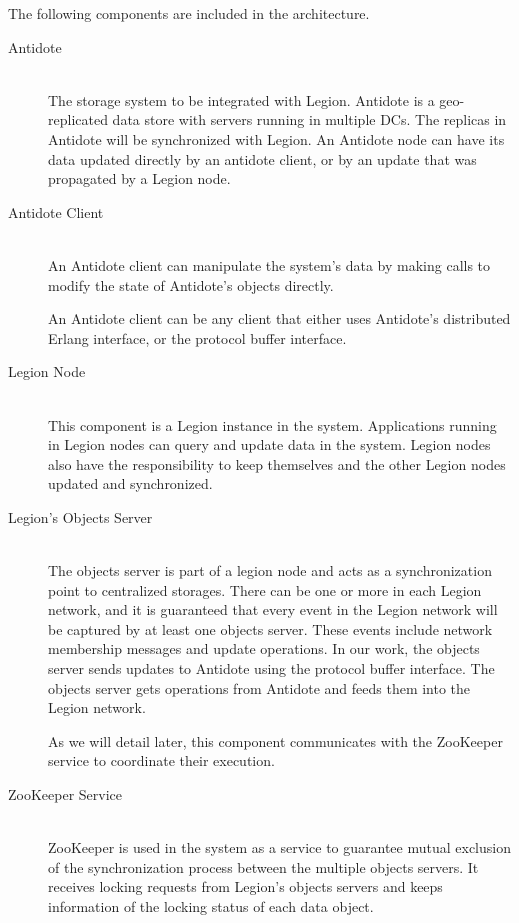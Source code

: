 \par
	The following components are included in the architecture.
\begin{description}

\item[Antidote] \hfill \\
The storage system to be integrated with Legion. Antidote is a geo-replicated data store with servers running in multiple DCs. The replicas in Antidote will be synchronized with Legion. An Antidote node can have its data updated directly by an antidote client, or by an update that was propagated by a Legion node.\par

\item[Antidote Client] \hfill \\
An Antidote client can manipulate the system's data by making calls to modify the state of Antidote's objects directly.\par
	An Antidote client can be any client that either uses Antidote's distributed Erlang interface, or the protocol buffer interface.


\item[Legion Node] \hfill \\
This component is a Legion instance in the system. Applications running in Legion nodes can query and update data in the system. Legion nodes also have the responsibility to keep themselves and the other Legion nodes updated and synchronized.


\item[Legion's Objects Server] \hfill \\
The objects server is part of a legion node and acts as a synchronization point to centralized storages. There can be one or more in each Legion network, and it is guaranteed that every event in the Legion network will be captured by at least one objects server. These events include network membership messages and update operations. In our work, the objects server sends updates to Antidote using the protocol buffer interface. The objects server gets operations from Antidote and feeds them into the Legion network.\par
	As we will detail later, this component communicates with the ZooKeeper service to coordinate their execution.

\item[ZooKeeper Service] \hfill \\
ZooKeeper is used in the system as a service to guarantee mutual exclusion of the synchronization process between the multiple objects servers. It receives locking requests from Legion's objects servers and keeps information of the locking status of each data object.

\end{description}

